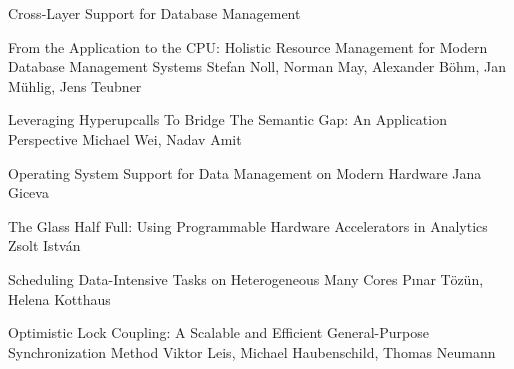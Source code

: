 \documentclass[11pt]{article}
\begin{document}
\begin{bulletin}
\begin{articlesection}{Cross-Layer Support for Database Management}
%
%
\begin{article}
{From the Application to the CPU: Holistic Resource Management for Modern Database Management Systems}
{Stefan Noll, Norman May, Alexander B\"{o}hm, Jan M\"{u}hlig, Jens Teubner}
\graphicspath{{submissions/snoll/figs/}}

\end{article}
%
\begin{article}
{Leveraging Hyperupcalls To Bridge The Semantic Gap: An Application Perspective}
{Michael Wei, Nadav Amit}
\graphicspath{{submissions/mwei/figs/}}

\end{article}

\begin{article}
{Operating System Support for Data Management on Modern Hardware}
{Jana Giceva}
\graphicspath{{submissions/jgiceva/figs/}}

\end{article}

\begin{article}
{The Glass Half Full: Using Programmable Hardware Accelerators in Analytics}
{Zsolt Istv\'{a}n}
\graphicspath{{submissions/zistvan/figs/}}

\end{article}

\begin{article}
{Scheduling Data-Intensive Tasks on Heterogeneous Many Cores}
{P{\i}nar T\"oz\"un, Helena Kotthaus}
\graphicspath{{submissions/ptozun/figs/}}

\end{article}

\begin{article}
{Optimistic Lock Coupling: A Scalable and Efficient General-Purpose Synchronization Method}
{Viktor Leis, Michael Haubenschild, Thomas Neumann}
\graphicspath{{submissions/vleis/figs/}}

\end{article}
\end{articlesection}


\end{bulletin}
\end{document}
